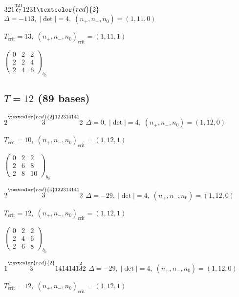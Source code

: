 \documentclass[10pt]{article}
\begin{document}
$321\overset{321}{\mathfrak{e}_7}1231\textcolor{red}{2}$ \quad $\Delta=-113,\; |\det|=4,\; (n_+,n_-,n_0)=(1,11,0)$

\hspace{1em}$T_{\text{crit}}=13,\; (n_+,n_-,n_0)_{\text{crit}}=(1,11,1)$

\hspace{2em}$\left(\begin{smallmatrix}0 & 2 & 2 \\ 2 & 2 & 4 \\ 2 & 4 & 6\end{smallmatrix}\right)_{\!b_0}$


\subsection*{$T = 12$ \quad (89 bases)}
\smallskip

$2\overset{\textcolor{red}{2}122314141}{3}2$ \quad $\Delta=0,\; |\det|=4,\; (n_+,n_-,n_0)=(1,12,0)$

\hspace{1em}$T_{\text{crit}}=10,\; (n_+,n_-,n_0)_{\text{crit}}=(1,12,1)$

\hspace{2em}$\left(\begin{smallmatrix}0 & 2 & 2 \\ 2 & 6 & 8 \\ 2 & 8 & 10\end{smallmatrix}\right)_{\!b_0}$

$2\overset{\textcolor{red}{4}122314141}{3}2$ \quad $\Delta=-29,\; |\det|=4,\; (n_+,n_-,n_0)=(1,12,0)$

\hspace{1em}$T_{\text{crit}}=12,\; (n_+,n_-,n_0)_{\text{crit}}=(1,12,1)$

\hspace{2em}$\left(\begin{smallmatrix}0 & 2 & 2 \\ 2 & 4 & 6 \\ 2 & 6 & 8\end{smallmatrix}\right)_{\!b_0}$

\smallskip

$1\overset{\textcolor{red}{2}}{3}1414141\overset{2}{3}2$ \quad $\Delta=-29,\; |\det|=4,\; (n_+,n_-,n_0)=(1,12,0)$

\hspace{1em}$T_{\text{crit}}=12,\; (n_+,n_-,n_0)_{\text{crit}}=(1,12,1)$
\end{document}
